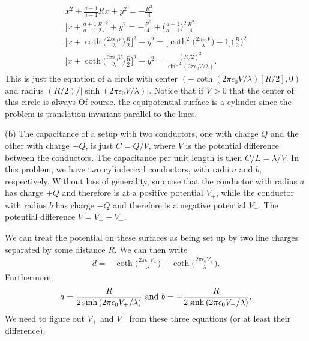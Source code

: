 {\begin{gather}
    x^2 + \frac{a + 1}{a-1}Rx + y^2 = - \frac{R^2}{4} \\
    \Big[ x + \frac{a+1}{a-1} \frac{R}{2} \Big]^2 + y^2 = - \frac{R^2}{4} + \Big(\frac{a+1}{a - 1} \Big)^2  \frac{R^2}{4} \\
    \Big[ x + \coth{\Big( \frac{2 \pi \epsilon_0 V}{\lambda} \Big)} \frac{R}{2} \Big]^2 + y^2 = \Big[ \coth^2{\Big( \frac{2 \pi \epsilon_0 V}{\lambda} \Big)} - 1 \Big] \Big( \frac{R}{2} \Big)^2 \\
    \Big[ x + \coth{\Big( \frac{2 \pi \epsilon_0 V}{\lambda} \Big)} \frac{R}{2} \Big]^2 + y^2 = \frac{(R/2)^2}{\sinh^2{( 2 \pi \epsilon_0 V / \lambda ) }}
.\end{gather}
This is just the equation of a circle with center $(-\coth{(2 \pi \epsilon_0 V / \lambda)} [R / 2], 0)$ and radius $(R/2)/|\sinh{(2 \pi \epsilon_0 V / \lambda)}|$.
Notice that if $V > 0$ that the center of this circle is always 
Of course, the equipotential surface is a cylinder since the problem is translation invariant parallel to the lines.

(b) The capacitance of a setup with two conductors, one with charge $Q$ and the other with charge $-Q$, is just $C = Q/V$, where $V$ is the potential difference between the conductors.
The capacitance per unit length is then $C/L = \lambda/V$.
In this problem, we have two cylinderical conductors, with radii $a$ and $b$, respectively.
Without loss of generality, suppose that the conductor with radius $a$ has charge $+Q$ and therefore is at a positive potential $V_{+}$, while the conductor with radius $b$ has charge $-Q$ and therefore is a negative potential $V_{-}$.
The potential difference $V = V_{+} - V_{-}$.

We can treat the potential on these surfaces as being set up by two line charges separated by some distance $R$.
We can then write
\begin{eqnarray}
    d = -\coth{\Big( \frac{2 \pi \epsilon_0 V_{-}}{\lambda} \Big)} + \coth{ \Big( \frac{2 \pi \epsilon_0 V_{+}}{\lambda} \Big) }
.\end{eqnarray}
Furthermore,
\begin{eqnarray}
    a = \frac{R}{2 \sinh{(2 \pi \epsilon_0 V_{+}} / \lambda)} ~{\rm and}~ b = -\frac{R}{2 \sinh{(2 \pi \epsilon_0 V_{-} / \lambda)}}
.\end{eqnarray}
We need to figure out $V_{+}$ and $V_{-}$ from these three equations (or at least their difference).

}
